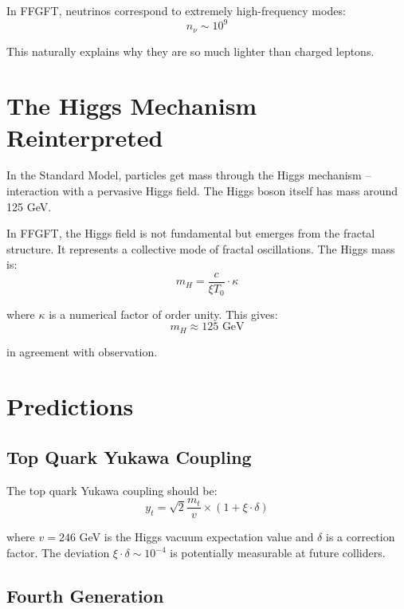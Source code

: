 In FFGFT, neutrinos correspond to extremely high-frequency modes:
\begin{equation}
n_\nu \sim 10^9
\end{equation}

This naturally explains why they are so much lighter than charged leptons.

\section{The Higgs Mechanism Reinterpreted}

In the Standard Model, particles get mass through the Higgs mechanism -- interaction with a pervasive Higgs field. The Higgs boson itself has mass around 125 GeV.

In FFGFT, the Higgs field is not fundamental but emerges from the fractal structure. It represents a collective mode of fractal oscillations. The Higgs mass is:
\begin{equation}
m_H = \frac{c}{\xi T_0} \cdot \kappa
\end{equation}

where $\kappa$ is a numerical factor of order unity. This gives:
\begin{equation}
m_H \approx 125 \text{ GeV}
\end{equation}

in agreement with observation.

\section{Predictions}

\subsection{Top Quark Yukawa Coupling}

The top quark Yukawa coupling should be:
\begin{equation}
y_t = \sqrt{2} \frac{m_t}{v} \times (1 + \xi \cdot \delta)
\end{equation}

where $v = 246$ GeV is the Higgs vacuum expectation value and $\delta$ is a correction factor. The deviation $\xi \cdot \delta \sim 10^{-4}$ is potentially measurable at future colliders.

\subsection{Fourth Generation}


